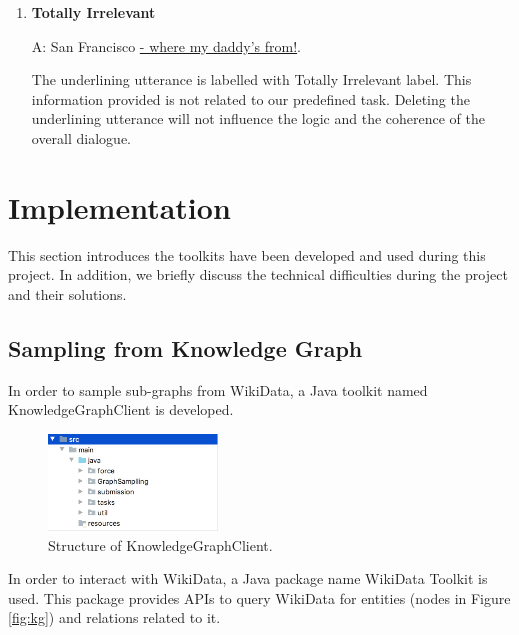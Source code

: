 \documentclass[bsc,frontabs,twoside,singlespacing,parskip,deptreport]{infthesis}     %
\begin{document}
\begin{enumerate}
\item \textbf{Totally Irrelevant}

\begin{exe}
	\ex
		\begin{xlist}
			\ex \label{ccq1} A: San Francisco \underline{- where my daddy's from!}.
\end{xlist}
\end{exe}


The underlining utterance is labelled with Totally Irrelevant label. This information provided is not related to our predefined task. Deleting the underlining utterance will not influence the logic and the coherence of the overall dialogue.

\end{enumerate}




\section{Implementation}

This section introduces the toolkits have been developed and used during this project. In addition, we briefly discuss the technical difficulties during the project and their solutions.

\subsection{Sampling from Knowledge Graph}

In order to sample sub-graphs from WikiData, a Java toolkit named KnowledgeGraphClient is developed.

\begin{figure}[h]
    \centering
    \includegraphics[width=0.4\textwidth]{client.png}
    \caption{Structure of KnowledgeGraphClient.}
    \label{fig:client}
\end{figure}

In order to interact with WikiData, a Java package name WikiData Toolkit \cite{wikitoolkit} is used. This package provides APIs to query WikiData for entities (nodes in Figure \ref{fig:kg}) and relations related to it.
\end{document}
